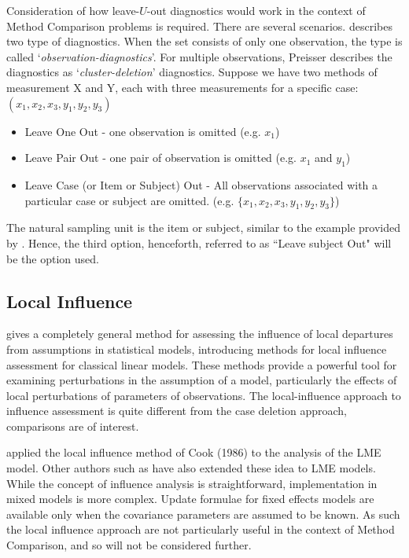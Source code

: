 \documentclass[12pt, a4paper]{report}
\theoremstyle{plain}
\theoremstyle{definition}
\theoremstyle{remark}
\begin{document}
Consideration of how leave-$U$-out diagnostics would work in the context of Method Comparison problems is required. There are several scenarios. \citet{preisser} describes two type of diagnostics. When the set consists of only one observation, the type is called
`\textit{observation-diagnostics}'. For multiple observations, Preisser describes the diagnostics as `\textit{cluster-deletion}' diagnostics. Suppose we have two methods of measurement X and Y, each with three measurements for a specific case: $(x_1,x_2,x_3,y_1,y_2,y_3)$

\begin{itemize}
	\item Leave One Out - one observation is omitted (e.g. $x_1$)
	\item Leave Pair Out - one pair of observation  is omitted (e.g. $x_1$ and $y_1$)
	\item Leave Case (or Item or Subject) Out - All observations associated with a particular case or subject are omitted. (e.g. $\{x_1,x_2,x_3,y_1,y_2,y_3\}$)
\end{itemize}

The natural sampling unit is the item or subject, similar to the example provided by \citet{schabenberger}. Hence, the third option, henceforth, referred to as ``Leave subject Out" will be the option used.


\subsection{Local Influence}
\citet{cook86} gives a completely general method for assessing the influence of local departures from assumptions in statistical models, introducing methods for local influence assessment for classical linear models. These methods provide a powerful tool for examining perturbations in the assumption of a model, particularly the effects of local perturbations of parameters of observations. The local-influence approach to influence assessment is quite different from the case deletion approach, comparisons are of interest.

\citet{Beckman} applied the local influence method of Cook (1986) to the analysis of the LME model.  Other authors such as \citet{lesaffre1998local} have also extended these idea to LME models. 
While the concept of influence analysis is straightforward, implementation in mixed models is more complex. Update formulae for fixed effects models are available only when the covariance parameters are assumed to be known. As such the local influence approach are not particularly useful in the context of Method Comparison, and so will not be considered further.
\end{document}
